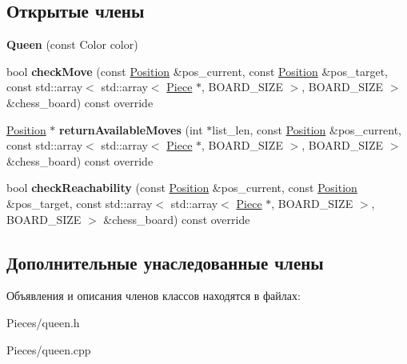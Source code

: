 \subsection*{Открытые члены}
\begin{DoxyCompactItemize}
\item 
\mbox{\label{class_chess_1_1_queen_a60311431cf43c98d3d47ac2f45f222ef}} 
{\bfseries Queen} (const Color color)
\item 
\mbox{\label{class_chess_1_1_queen_a3b208172bb8bc1fbcda3c232b1c5a612}} 
bool {\bfseries check\+Move} (const \mbox{\hyperlink{class_chess_1_1_position}{Position}} \&pos\+\_\+current, const \mbox{\hyperlink{class_chess_1_1_position}{Position}} \&pos\+\_\+target, const std\+::array$<$ std\+::array$<$ \mbox{\hyperlink{class_chess_1_1_piece}{Piece}} $\ast$, B\+O\+A\+R\+D\+\_\+\+S\+I\+ZE $>$, B\+O\+A\+R\+D\+\_\+\+S\+I\+ZE $>$ \&chess\+\_\+board) const override
\item 
\mbox{\label{class_chess_1_1_queen_ab38744d01eac33fce5c917ee726bb323}} 
\mbox{\hyperlink{class_chess_1_1_position}{Position}} $\ast$ {\bfseries return\+Available\+Moves} (int $\ast$list\+\_\+len, const \mbox{\hyperlink{class_chess_1_1_position}{Position}} \&pos\+\_\+current, const std\+::array$<$ std\+::array$<$ \mbox{\hyperlink{class_chess_1_1_piece}{Piece}} $\ast$, B\+O\+A\+R\+D\+\_\+\+S\+I\+ZE $>$, B\+O\+A\+R\+D\+\_\+\+S\+I\+ZE $>$ \&chess\+\_\+board) const override
\item 
\mbox{\label{class_chess_1_1_queen_af4cfcec4022fc26e99b89559ca3d6bc7}} 
bool {\bfseries check\+Reachability} (const \mbox{\hyperlink{class_chess_1_1_position}{Position}} \&pos\+\_\+current, const \mbox{\hyperlink{class_chess_1_1_position}{Position}} \&pos\+\_\+target, const std\+::array$<$ std\+::array$<$ \mbox{\hyperlink{class_chess_1_1_piece}{Piece}} $\ast$, B\+O\+A\+R\+D\+\_\+\+S\+I\+ZE $>$, B\+O\+A\+R\+D\+\_\+\+S\+I\+ZE $>$ \&chess\+\_\+board) const override
\end{DoxyCompactItemize}
\subsection*{Дополнительные унаследованные члены}


Объявления и описания членов классов находятся в файлах\+:\begin{DoxyCompactItemize}
\item 
Pieces/queen.\+h\item 
Pieces/queen.\+cpp\end{DoxyCompactItemize}
